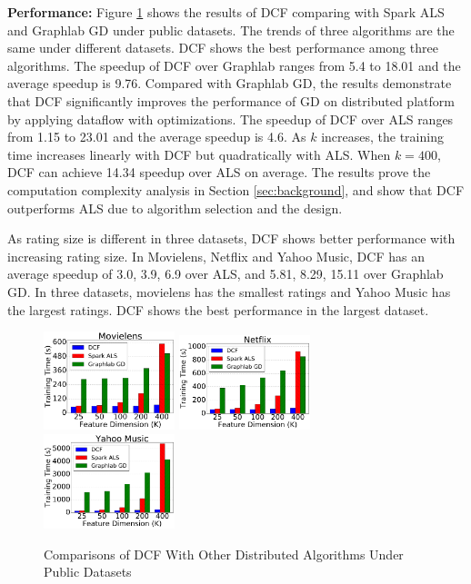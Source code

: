 \documentclass{llncs}
\begin{document}
\textbf{Performance:} Figure \ref{fig:dcfPerformance} shows the results of DCF comparing with Spark ALS and Graphlab GD under public datasets. The trends of three algorithms are the same under different datasets. DCF shows the best performance among three algorithms. The speedup of DCF over Graphlab ranges from 5.4 to 18.01 and the average speedup is 9.76. Compared with Graphlab GD, the results demonstrate that DCF significantly improves the performance of GD on distributed platform by applying dataflow with optimizations. The speedup of DCF over ALS ranges from 1.15 to 23.01 and the average speedup is 4.6. As $k$ increases, the training time increases linearly with DCF but quadratically with ALS. When $k=400$, DCF can achieve 14.34 speedup over ALS on average. The results prove the computation complexity analysis in Section \ref{sec:background}, and show that DCF outperforms ALS due to algorithm selection and the design.

As rating size is different in three datasets, DCF shows better performance with increasing rating size. In Movielens, Netflix and Yahoo Music, DCF has an average speedup of 3.0, 3.9, 6.9 over ALS, and 5.81, 8.29, 15.11 over Graphlab GD. In three datasets, movielens has the smallest ratings and Yahoo Music has the largest ratings. DCF shows the best performance in the largest dataset.

\begin{figure}[!t]
\centering
\includegraphics[width=1.5in]{pics/movielens.pdf}
\includegraphics[width=1.5in]{pics/netflix.pdf}
\includegraphics[width=1.5in]{pics/yahoo.pdf}
\vspace{-10pt}
\caption{Comparisons of DCF With Other Distributed Algorithms Under Public Datasets}
\vspace{-15pt}
\label{fig:dcfPerformance}
\end{figure}
\end{document}
